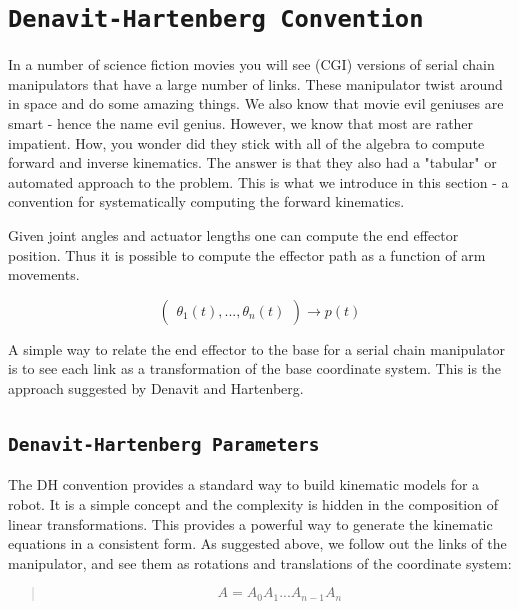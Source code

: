 \hypertarget{denavit-hartenberg-convention}{%
\section{\texorpdfstring{\texttt{Denavit-Hartenberg\ Convention}}{Denavit-Hartenberg Convention}}\label{denavit-hartenberg-convention}}

In a number of science fiction movies you will see (CGI) versions of
serial chain manipulators that have a large number of links. These
manipulator twist around in space and do some amazing things. We also
know that movie evil geniuses are smart - hence the name evil genius.
However, we know that most are rather impatient. How, you wonder did
they stick with all of the algebra to compute forward and inverse
kinematics. The answer is that they also had a "tabular" or automated
approach to the problem. This is what we introduce in this section - a
convention for systematically computing the forward kinematics.

Given joint angles and actuator lengths one can compute the end effector
position. Thus it is possible to compute the effector path as a function
of arm movements.

\[\begin{pmatrix} \theta_1(t), ... , \theta_n(t)
           \end{pmatrix}\to p(t)\]

A simple way to relate the end effector to the base for a serial chain
manipulator is to see each link as a transformation of the base
coordinate system. This is the approach suggested by Denavit and
Hartenberg.

\hypertarget{denavit-hartenberg-parameters}{%
\subsection{\texorpdfstring{\texttt{Denavit-Hartenberg\ Parameters}}{Denavit-Hartenberg Parameters}}\label{denavit-hartenberg-parameters}}

The DH convention provides a standard way to build kinematic models for
a robot. It is a simple concept and the complexity is hidden in the
composition of linear transformations. This provides a powerful way to
generate the kinematic equations in a consistent form. As suggested
above, we follow out the links of the manipulator, and see them as
rotations and translations of the coordinate system:

\begin{quote}
\[A = A_0 A_1 ...A_{n-1} A_n\]
\end{quote}


